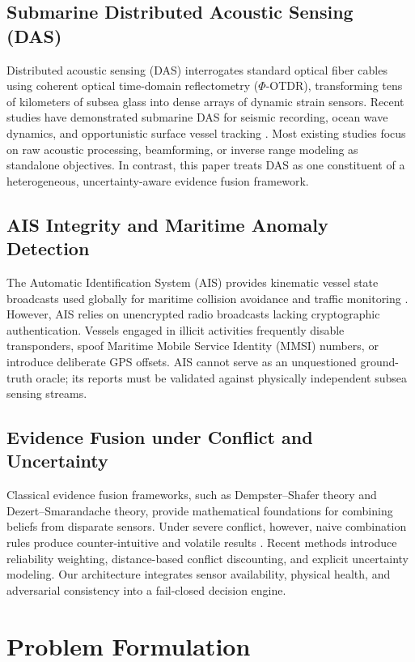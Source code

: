 \documentclass[conference]{IEEEtran}
\begin{document}
\subsection{Submarine Distributed Acoustic Sensing (DAS)}
Distributed acoustic sensing (DAS) interrogates standard optical fiber cables using
coherent optical time-domain reflectometry ($\Phi$-OTDR), transforming tens of
kilometers of subsea glass into dense arrays of dynamic strain sensors. Recent
studies have demonstrated submarine DAS for seismic recording, ocean wave
dynamics, and opportunistic surface vessel tracking \cite{b11,b12,b13,b14,b15}.
Most existing studies focus on raw acoustic processing, beamforming, or inverse
range modeling as standalone objectives. In contrast, this paper treats DAS as
one constituent of a heterogeneous, uncertainty-aware evidence fusion framework.

\subsection{AIS Integrity and Maritime Anomaly Detection}
The Automatic Identification System (AIS) provides kinematic vessel state
broadcasts used globally for maritime collision avoidance and traffic monitoring
\cite{b5,b6,b7}. However, AIS relies on unencrypted radio broadcasts lacking
cryptographic authentication. Vessels engaged in illicit activities frequently
disable transponders, spoof Maritime Mobile Service Identity (MMSI) numbers, or introduce deliberate GPS
offsets. AIS cannot serve as an unquestioned ground-truth oracle; its reports
must be validated against physically independent subsea sensing streams.

\subsection{Evidence Fusion under Conflict and Uncertainty}
Classical evidence fusion frameworks, such as Dempster--Shafer theory and
Dezert--Smarandache theory, provide mathematical foundations for combining
beliefs from disparate sensors. Under severe conflict, however, naive
combination rules produce counter-intuitive and volatile results \cite{b8,b9,b10}.
Recent methods introduce reliability weighting, distance-based conflict
discounting, and explicit uncertainty modeling. Our architecture integrates
sensor availability, physical health, and adversarial consistency into a
fail-closed decision engine.

\section{Problem Formulation}
\end{document}
